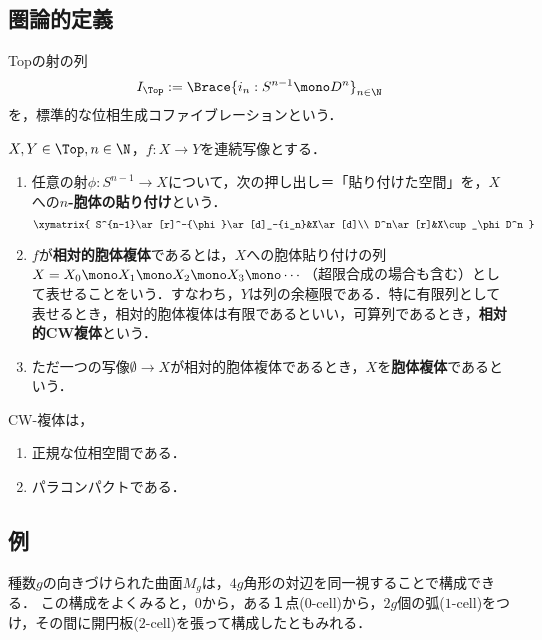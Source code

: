 \documentclass[uplatex, dvipdfmx]{jsreport}
\begin{document}
\subsection{圏論的定義}

\begin{notation}
    Topの射の列
    \[I_\Top:=\Brace{i_n:S^{n-1}\mono D^n}_{n\in\N}\]
    を，標準的な位相生成コファイブレーションという．
\end{notation}

\begin{definition}
    $X,Y\in\Top,n\in\N$，$f:X\to Y$を連続写像とする．
    \begin{enumerate}
        \item 任意の射$\phi:S^{n-1}\to X$について，次の押し出し＝「貼り付けた空間」を，$X$への\textbf{$n$-胞体の貼り付け}という．
        \[\xymatrix{
            S^{n-1}\ar[r]^-{\phi}\ar[d]_-{i_n}&X\ar[d]\\
            D^n\ar[r]&X\cup_\phi D^n
        }\]
        \item $f$が\textbf{相対的胞体複体}であるとは，$X$への胞体貼り付けの列$X=X_0\mono X_1\mono X_2\mono X_3\mono\cdots$（超限合成の場合も含む）として表せることをいう．すなわち，$Y$は列の余極限である．特に有限列として表せるとき，相対的胞体複体は有限であるといい，可算列であるとき，\textbf{相対的CW複体}という．
        \item ただ一つの写像$\emptyset\to X$が相対的胞体複体であるとき，$X$を\textbf{胞体複体}であるという．
    \end{enumerate}
\end{definition}

\begin{lemma}
    CW-複体は，
    \begin{enumerate}
        \item 正規な位相空間である．
        \item パラコンパクトである．
    \end{enumerate}
\end{lemma}

\subsection{例}

\begin{example}[torusの一般化]
    種数$g$の向きづけられた曲面$M_g$は，$4g$角形の対辺を同一視することで構成できる．
    この構成をよくみると，$0$から，ある１点($0$-cell)から，$2g$個の弧($1$-cell)をつけ，その間に開円板($2$-cell)を張って構成したともみれる．
\end{example}
\end{document}
